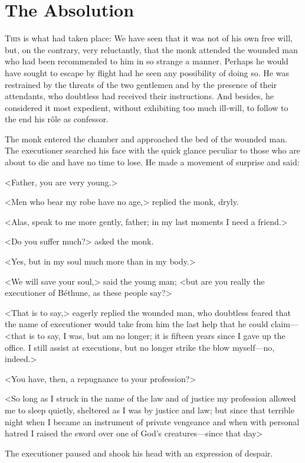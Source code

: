 \chapter{The Absolution}

 \lettrine{T}{his} is what had taken place: We have seen that it was not of his own free will, but, on the contrary, very reluctantly, that the monk attended the wounded man who had been recommended to him in so strange a manner. Perhaps he would have sought to escape by flight had he seen any possibility of doing so. He was restrained by the threats of the two gentlemen and by the presence of their attendants, who doubtless had received their instructions. And besides, he considered it most expedient, without exhibiting too much ill-will, to follow to the end his rôle as confessor.

The monk entered the chamber and approached the bed of the wounded man. The executioner searched his face with the quick glance peculiar to those who are about to die and have no time to lose. He made a movement of surprise and said:

<Father, you are very young.>

<Men who bear my robe have no age,> replied the monk, dryly.

<Alas, speak to me more gently, father; in my last moments I need a friend.>

<Do you suffer much?> asked the monk.

<Yes, but in my soul much more than in my body.>

<We will save your soul,> said the young man; <but are you really the executioner of Béthune, as these people say?>

<That is to say,> eagerly replied the wounded man, who doubtless feared that the name of executioner would take from him the last help that he could claim—<that is to say, I was, but am no longer; it is fifteen years since I gave up the office. I still assist at executions, but no longer strike the blow myself—no, indeed.>

<You have, then, a repugnance to your profession?>

<So long as I struck in the name of the law and of justice my profession allowed me to sleep quietly, sheltered as I was by justice and law; but since that terrible night when I became an instrument of private vengeance and when with personal hatred I raised the sword over one of God's creatures—since that day\longdash>

The executioner paused and shook his head with an expression of despair.

